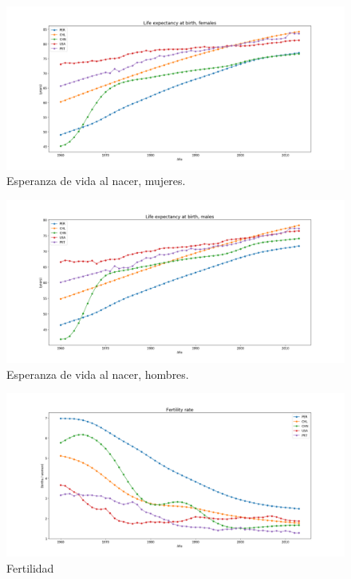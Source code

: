 \documentclass{article}
\begin{document}
\begin{figure}
	\centering
	\includegraphics[scale=0.38]{images/figure_1.png}
	\caption{Esperanza de vida al nacer, mujeres.}
	\label{fig:2}
\end{figure}

\begin{figure}
	\centering
	\includegraphics[scale=0.38]{images/figure_1-1.png}
	\caption{Esperanza de vida al nacer, hombres.}
	\label{fig:3}
\end{figure}

\begin{figure}
	\centering
	\includegraphics[scale=0.38]{images/figure_1-2.png}
	\caption{Fertilidad}
	\label{fig:4}
\end{figure}
\end{document}
